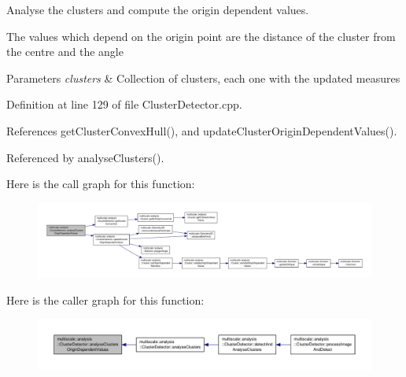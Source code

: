 Analyse the clusters and compute the origin dependent values. 

The values which depend on the origin point are the distance of the cluster from the centre and the angle


\begin{DoxyParams}{Parameters}
{\em clusters} & Collection of clusters, each one with the updated measures \\
\hline
\end{DoxyParams}


Definition at line 129 of file Cluster\-Detector.\-cpp.



References get\-Cluster\-Convex\-Hull(), and update\-Cluster\-Origin\-Dependent\-Values().



Referenced by analyse\-Clusters().



Here is the call graph for this function\-:
\nopagebreak
\begin{figure}[H]
\begin{center}
\leavevmode
\includegraphics[width=350pt]{classmultiscale_1_1analysis_1_1ClusterDetector_affff27bd4559d1272913ff1bceb229b5_cgraph}
\end{center}
\end{figure}




Here is the caller graph for this function\-:\nopagebreak
\begin{figure}[H]
\begin{center}
\leavevmode
\includegraphics[width=350pt]{classmultiscale_1_1analysis_1_1ClusterDetector_affff27bd4559d1272913ff1bceb229b5_icgraph}
\end{center}
\end{figure}


